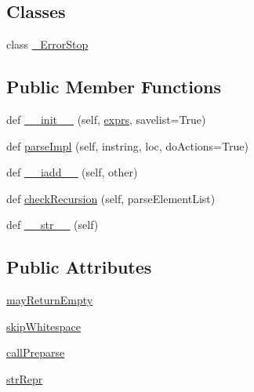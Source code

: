 \subsection*{Classes}
\begin{DoxyCompactItemize}
\item 
class \hyperlink{classsetuptools_1_1__vendor_1_1pyparsing_1_1And_1_1__ErrorStop}{\+\_\+\+Error\+Stop}
\end{DoxyCompactItemize}
\subsection*{Public Member Functions}
\begin{DoxyCompactItemize}
\item 
def \hyperlink{classsetuptools_1_1__vendor_1_1pyparsing_1_1And_a59d77c899356bf54d089ad7a17a5ecd3}{\+\_\+\+\_\+init\+\_\+\+\_\+} (self, \hyperlink{classsetuptools_1_1__vendor_1_1pyparsing_1_1ParseExpression_a4e2611e5f2c7118fb18cdc4a710bd3db}{exprs}, savelist=True)
\item 
def \hyperlink{classsetuptools_1_1__vendor_1_1pyparsing_1_1And_a0ce053c8ce13c73b1efc28c11902037d}{parse\+Impl} (self, instring, loc, do\+Actions=True)
\item 
def \hyperlink{classsetuptools_1_1__vendor_1_1pyparsing_1_1And_abd80bd1cba05b111f1c56661ced6f228}{\+\_\+\+\_\+iadd\+\_\+\+\_\+} (self, other)
\item 
def \hyperlink{classsetuptools_1_1__vendor_1_1pyparsing_1_1And_ab30ab396462a7d5f0ee26d0a9f429c3f}{check\+Recursion} (self, parse\+Element\+List)
\item 
def \hyperlink{classsetuptools_1_1__vendor_1_1pyparsing_1_1And_aa4ba9495e7806de3a2de95cdfa6d5ba4}{\+\_\+\+\_\+str\+\_\+\+\_\+} (self)
\end{DoxyCompactItemize}
\subsection*{Public Attributes}
\begin{DoxyCompactItemize}
\item 
\hyperlink{classsetuptools_1_1__vendor_1_1pyparsing_1_1And_ae9cb0d562228054fc0e1a2ceae114ede}{may\+Return\+Empty}
\item 
\hyperlink{classsetuptools_1_1__vendor_1_1pyparsing_1_1And_ab1188a09b994a812be606006583ecb59}{skip\+Whitespace}
\item 
\hyperlink{classsetuptools_1_1__vendor_1_1pyparsing_1_1And_afd59d88d0a9b614c17c0c57a8e6367c5}{call\+Preparse}
\item 
\hyperlink{classsetuptools_1_1__vendor_1_1pyparsing_1_1And_a36eb67d1cebb650105eab01844b4b483}{str\+Repr}
\end{DoxyCompactItemize}

